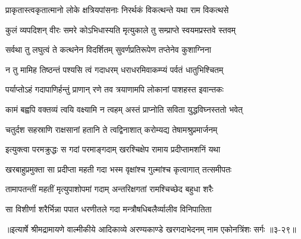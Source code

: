 \twolineshloka
{प्राकृतास्त्वकृतात्मानो लोके क्षत्रियपांसनाः}
{निरर्थकं विकत्थन्ते यथा राम विकत्थसे} %

\twolineshloka
{कुलं व्यपदिशन् वीरः समरे कोऽभिधास्यति}
{मृत्युकाले तु सम्प्राप्ते स्वयमप्रस्तवे स्तवम्} %

\twolineshloka
{सर्वथा तु लघुत्वं ते कत्थनेन विदर्शितम्}
{सुवर्णप्रतिरूपेण तप्तेनेव कुशाग्निना} %

\twolineshloka
{न तु मामिह तिष्ठन्तं पश्यसि त्वं गदाधरम्}
{धराधरमिवाकम्प्यं पर्वतं धातुभिश्चितम्} %

\twolineshloka
{पर्याप्तोऽहं गदापाणिर्हन्तुं प्राणान् रणे तव}
{त्रयाणामपि लोकानां पाशहस्त इवान्तकः} %

\twolineshloka
{कामं बह्वपि वक्तव्यं त्वयि वक्ष्यामि न त्वहम्}
{अस्तं प्राप्नोति सविता युद्धविघ्नस्ततो भवेत्} %

\twolineshloka
{चतुर्दश सहस्राणि राक्षसानां हतानि ते}
{त्वद्विनाशात् करोम्यद्य तेषामश्रुप्रमार्जनम्} %

\twolineshloka
{इत्युक्त्वा परमक्रुद्धः स गदां परमाङ्गदाम्}
{खरश्चिक्षेप रामाय प्रदीप्तामशनिं यथा} %

\twolineshloka
{खरबाहुप्रमुक्ता सा प्रदीप्ता महती गदा}
{भस्म वृक्षांश्च गुल्मांश्च कृत्वागात् तत्समीपतः} %

\twolineshloka
{तामापतन्तीं महतीं मृत्युपाशोपमां गदाम्}
{अन्तरिक्षगतां रामश्चिच्छेद बहुधा शरैः} %

\twolineshloka
{सा विशीर्णा शरैर्भिन्ना पपात धरणीतले}
{गदा मन्त्रौषधिबलैर्व्यालीव विनिपातिता} %


॥इत्यार्षे श्रीमद्रामायणे वाल्मीकीये आदिकाव्ये अरण्यकाण्डे खरगदाभेदनम् नाम एकोनत्रिंशः सर्गः ॥३-२९॥
